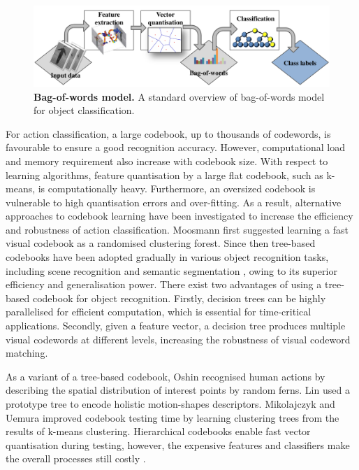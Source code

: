 \begin{figure}[t]
	\centering  	
	\includegraphics[width=1\linewidth]{fig/act/bow.pdf}
	\caption{\textbf{Bag-of-words model.} A standard overview of bag-of-words model for object classification.}
	\label{fig/act/bow}
\end{figure}


For action classification, a large codebook, \eg up to thousands of codewords, is favourable to ensure a good recognition accuracy. However, computational load and memory requirement also increase with codebook size. With respect to learning algorithms, feature quantisation by a large flat codebook, such as k-means, is computationally heavy. Furthermore, an oversized codebook is vulnerable to high quantisation errors and over-fitting. As a result, alternative approaches to codebook learning have been investigated to increase the efficiency and robustness of action classification. Moosmann \etal \cite{Moosmann2007} first suggested learning a fast visual codebook as a randomised clustering forest. Since then tree-based codebooks have been adopted gradually in various object recognition tasks, including scene recognition \cite{Bosch2007} and semantic segmentation \cite{Shotton2008}, owing to its superior efficiency and generalisation power. There exist two advantages of using a tree-based codebook for object recognition. Firstly, decision trees can be highly parallelised for efficient computation, which is essential for time-critical applications. Secondly, given a feature vector, a decision tree produces multiple visual codewords at different levels, increasing the robustness of visual codeword matching. 

As a variant of a tree-based codebook, Oshin \etal \cite{Oshin2009} recognised human actions by describing the spatial distribution of interest points by random ferns. Lin \etal \cite{Lin2009} used a prototype tree to encode holistic motion-shapes descriptors.  Mikolajczyk and Uemura \cite{Mikolajczyk2008} improved codebook testing time by learning clustering trees from the results of k-means clustering. Hierarchical codebooks enable fast vector quantisation during testing, however, the expensive features and classifiers make the overall processes still costly \cite{Lin2009, Mikolajczyk2008}.


